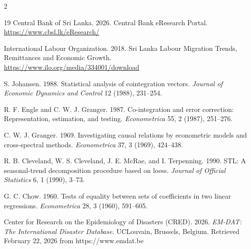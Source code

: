 \documentclass[sigconf]{acmart}
\begin{document}
\begin{multicols*}{2}
\begin{thebibliography}{19}
Central Bank of Sri Lanka. 2026.
Central Bank eResearch Portal.
\url{https://www.cbsl.lk/eResearch/}

International Labour Organization. 2018.
Sri Lanka Labour Migration Trends, Remittances and Economic Growth.
\url{https://www.ilo.org/media/334001/download}

S. Johansen. 1988.
Statistical analysis of cointegration vectors.
\textit{Journal of Economic Dynamics and Control} 12 (1988), 231--254.

R. F. Engle and C. W. J. Granger. 1987.
Co-integration and error correction: Representation, estimation, and testing.
\textit{Econometrica} 55, 2 (1987), 251--276.

C. W. J. Granger. 1969.
Investigating causal relations by econometric models and cross-spectral methods.
\textit{Econometrica} 37, 3 (1969), 424--438.

R. B. Cleveland, W. S. Cleveland, J. E. McRae, and I. Terpenning. 1990.
STL: A seasonal-trend decomposition procedure based on loess.
\textit{Journal of Official Statistics} 6, 1 (1990), 3--73.

G. C. Chow. 1960.
Tests of equality between sets of coefficients in two linear regressions.
\textit{Econometrica} 28, 3 (1960), 591--605.

Center for Research on the Epidemiology of Disasters (CRED). 2026. \textit{EM-DAT: The International Disaster Database}. UCLouvain, Brussels, Belgium. Retrieved February 22, 2026 from https://www.emdat.be

\end{thebibliography}
\end{multicols*}
\end{document}
